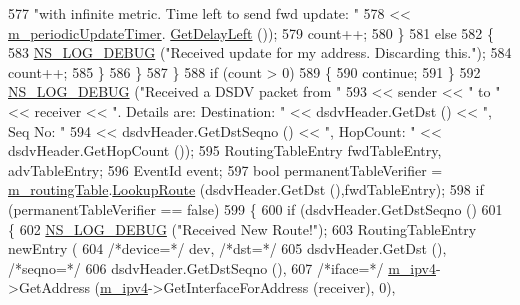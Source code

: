 \begin{DoxyCode}
577                                 \textcolor{stringliteral}{"with infinite metric. Time left to send fwd update: "}
578                                 << \hyperlink{classns3_1_1dsdv_1_1RoutingProtocol_a851fbb5569e6681fd1c42f47d2a79ee8}{m\_periodicUpdateTimer}.
      \hyperlink{classns3_1_1Timer_a0dc288dd3de21a524d088fc8a5a14a73}{GetDelayLeft} ());
579                   count++;
580                 \}
581               \textcolor{keywordflow}{else}
582                 \{
583                   \hyperlink{group__logging_ga413f1886406d49f59a6a0a89b77b4d0a}{NS\_LOG\_DEBUG} (\textcolor{stringliteral}{"Received update for my address. Discarding this."});
584                   count++;
585                 \}
586             \}
587         \}
588       \textcolor{keywordflow}{if} (count > 0)
589         \{
590           \textcolor{keywordflow}{continue};
591         \}
592       \hyperlink{group__logging_ga413f1886406d49f59a6a0a89b77b4d0a}{NS\_LOG\_DEBUG} (\textcolor{stringliteral}{"Received a DSDV packet from "}
593                     << sender << \textcolor{stringliteral}{" to "} << receiver << \textcolor{stringliteral}{". Details are: Destination: "} << dsdvHeader.GetDst 
      () << \textcolor{stringliteral}{", Seq No: "}
594                     << dsdvHeader.GetDstSeqno () << \textcolor{stringliteral}{", HopCount: "} << dsdvHeader.GetHopCount ());
595       RoutingTableEntry fwdTableEntry, advTableEntry;
596       EventId event;
597       \textcolor{keywordtype}{bool} permanentTableVerifier = \hyperlink{classns3_1_1dsdv_1_1RoutingProtocol_acc4cee466c2591e35f508ce58097a00e}{m\_routingTable}.\hyperlink{classns3_1_1dsdv_1_1RoutingTable_a0bfb9dc677f02bd740973865e38df763}{LookupRoute} (dsdvHeader.GetDst 
      (),fwdTableEntry);
598       \textcolor{keywordflow}{if} (permanentTableVerifier == \textcolor{keyword}{false})
599         \{
600           \textcolor{keywordflow}{if} (dsdvHeader.GetDstSeqno () %
601             \{
602               \hyperlink{group__logging_ga413f1886406d49f59a6a0a89b77b4d0a}{NS\_LOG\_DEBUG} (\textcolor{stringliteral}{"Received New Route!"});
603               RoutingTableEntry newEntry (
604                 \textcolor{comment}{/*device=*/} dev, \textcolor{comment}{/*dst=*/}
605                 dsdvHeader.GetDst (), \textcolor{comment}{/*seqno=*/}
606                 dsdvHeader.GetDstSeqno (),
607                 \textcolor{comment}{/*iface=*/} \hyperlink{classns3_1_1dsdv_1_1RoutingProtocol_a955477c7f38e64762a264c24e3762af6}{m\_ipv4}->GetAddress (\hyperlink{classns3_1_1dsdv_1_1RoutingProtocol_a955477c7f38e64762a264c24e3762af6}{m\_ipv4}->GetInterfaceForAddress (receiver), 0),

\end{DoxyCode}
